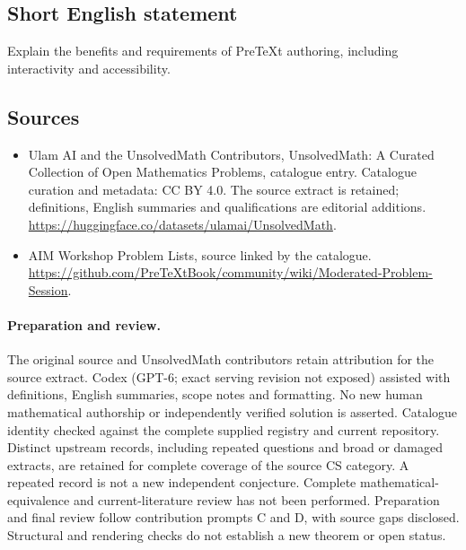 \documentclass[11pt]{article}
\begin{document}
\subsection{Short English statement}
Explain the benefits and requirements of PreTeXt authoring, including interactivity and accessibility.
\subsection{Sources}
\begin{itemize}
\item[\hypertarget{source:statement:1}{S1}] Ulam AI and the UnsolvedMath Contributors, UnsolvedMath: A Curated Collection of Open Mathematics Problems, catalogue entry. Catalogue curation and metadata: CC BY 4.0. The source extract is retained; definitions, English summaries and qualifications are editorial additions.
\url{https://huggingface.co/datasets/ulamai/UnsolvedMath}.
\item[\hypertarget{source:statement:2}{S2}] AIM Workshop Problem Lists, source linked by the catalogue.
\url{https://github.com/PreTeXtBook/community/wiki/Moderated-Problem-Session}.
\end{itemize}
\paragraph{Preparation and review.}
The original source and UnsolvedMath contributors retain attribution for the source extract. Codex (GPT-6; exact serving revision not exposed) assisted with definitions, English summaries, scope notes and formatting. No new human mathematical authorship or independently verified solution is asserted. Catalogue identity checked against the complete supplied registry and current repository. Distinct upstream records, including repeated questions and broad or damaged extracts, are retained for complete coverage of the source CS category. A repeated record is not a new independent conjecture. Complete mathematical-equivalence and current-literature review has not been performed. Preparation and final review follow contribution prompts C and D, with source gaps disclosed. Structural and rendering checks do not establish a new theorem or open status.
\label{end:statement}
\end{document}
